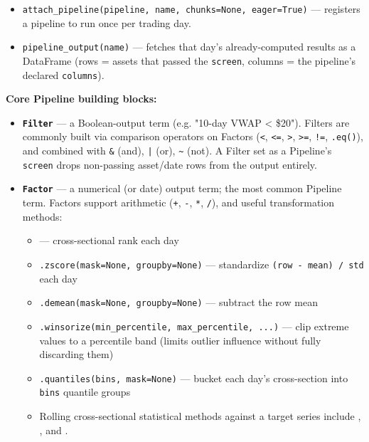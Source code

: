 \documentclass[12pt,openany]{book}
\theoremstyle{definition}
\theoremstyle{remark}
\begin{document}
\begin{itemize}
\item 
\texttt{attach\_pipeline(pipeline, name, chunks=None, eager=True)} — registers a pipeline to run once per trading day.

\item 
\texttt{pipeline\_output(name)} — fetches that day's already-computed results as a DataFrame (rows = assets that passed the \texttt{screen}, columns = the pipeline's declared \texttt{columns}).

\end{itemize}

\textbf{Core Pipeline building blocks:}

\begin{itemize}
\item 
\textbf{\texttt{Filter}} — a Boolean-output term (e.g. "10-day VWAP < \$20"). Filters are commonly built via comparison operators on Factors (\texttt{<}, \texttt{<=}, \texttt{>}, \texttt{>=}, \texttt{!=}, \texttt{.eq()}), and combined with \texttt{\&} (and), \texttt{|} (or), \texttt{\textasciitilde{}} (not). A Filter set as a Pipeline's \texttt{screen} drops non-passing asset/date rows from the output entirely.

\item 
\textbf{\texttt{Factor}} — a numerical (or date) output term; the most common Pipeline term. Factors support arithmetic (\texttt{+}, \texttt{-}, \texttt{*}, \texttt{/}), and useful transformation methods:

\begin{itemize}
\item 
{} —
cross-sectional rank each day

\item 
\texttt{.zscore(mask=None, groupby=None)} — standardize \texttt{(row - mean) / std} each day

\item 
\texttt{.demean(mask=None, groupby=None)} — subtract the row mean

\item 
\texttt{.winsorize(min\_percentile, max\_percentile, ...)} — clip extreme values to a percentile band (limits outlier influence without fully discarding them)

\item 
\texttt{.quantiles(bins, mask=None)} — bucket each day's cross-section into \texttt{bins} quantile groups

\item 
Rolling cross-sectional statistical methods against a target series include
,
, and
.


\end{itemize}
\end{itemize}
\end{document}
